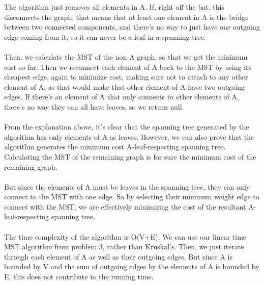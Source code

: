 \begin{enumerate}
    The algorithm just removes all elements in A. If, right off the bat, this disconnects the graph, that means that at least one element in A is the bridge between two connected components, and there's no way to just have one outgoing edge coming from it, so it can never be a leaf in a spanning tree.\\\\
    Then, we calculate the MST of the non-A graph, so that we get the minimum cost so far. Then we reconnect each element of A back to the MST by using its cheapest edge, again to minimize cost, making sure not to attach to any other element of A, as that would make that other element of A have two outgoing edges. If there's an element of A that only connects to other elements of A, there's no way they can all have leaves, so we return null.\\\\
    From the explanation above, it's clear that the spanning tree generated by the algorithm has only elements of A as leaves. However, we can also prove that the algorithm generates the minimum cost A-leaf-respecting spanning tree. Calculating the MST of the remaining graph is for sure the minimum cost of the remaining graph.\\\\
    But since the elements of A must be leaves in the spanning tree, they can only connect to the MST with one edge. So by selecting their minimum weight edge to connect with the MST, we are effectively minimizing the cost of the resultant A-leaf-respecting spanning tree.\\\\
    The time complexity of the algorithm is O(V+E). We can use our linear time MST algorithm from problem 3, rather than Kruskal's. Then, we just iterate through each element of A as well as their outgoing edges. But since A is bounded by V and the sum of outgoing edges by the elements of A is bounded by E, this does not contribute to the running time.\\
        

\end{enumerate}
